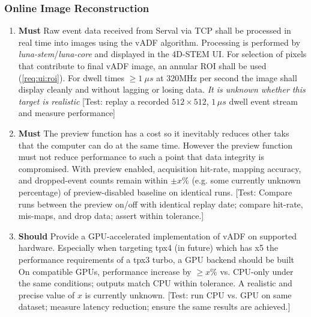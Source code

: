 \documentclass[12pt]{article}
\newcommand{\PriorityTag}[2]{%
  \colorbox{#2!25}{\footnotesize\textsf{\textbf{#1}}}\hspace{0.6em}}
\newcommand{\must}{\leavevmode\PriorityTag{Must}{green}}
\newcommand{\should}{\leavevmode\PriorityTag{Should}{yellow}}
\newcounter{reqgrp}[section] %
\newcounter{reqno}
\newcommand{\reqprefix}{GEN}
\newenvironment{requirements}[1]{%
  \renewcommand{\reqprefix}{#1}%
  \refstepcounter{reqgrp}%
  \setcounter{reqno}{0}%
  \begin{enumerate}[leftmargin=*]
}{\end{enumerate}}
\begin{document}
\subsubsection{Online Image Reconstruction}
\begin{requirements}{OIR}

\item \must {}
  {Raw event data received from Serval via TCP shall be processed in real time into images using the vADF algorithm. Processing is performed by \emph{luna-stem}/\emph{luna-core} and displayed in the 4D-STEM UI. For selection of pixels that contribute to final vADF image, an annular ROI shall be used (\cref{req:ui:roi})}.
  {For dwell times \(\ge 1\ \mu s\) at 320MHz per second the image shall display cleanly and without lagging or losing data. \textit{It is unknown whether this target is realistic}}
  [Test: replay a recorded \(512\times512\), \(1\,\mu s\) dwell event stream and measure performance]

\item \must {}
  {The preview function has a cost so it inevitably reduces other taks that the computer can do at the same time. However the preview function must not reduce performance to such a point that data integrity is compromised.}
  {With preview enabled, acquisition hit-rate, mapping accuracy, and dropped-event counts remain within \(\pm x\%\) (e.g. some currently unknown percentage) of preview-disabled baseline on identical runs.}
  [Test: Compare runs between the preview on/off with identical replay date; compare hit-rate, mis-maps, and drop data; assert within tolerance.]

\item \should {}
  {Provide a GPU-accelerated implementation of vADF on supported hardware. Especially when targeting tpx4 (in future) which has x5 the performance requirements of a tpx3 turbo, a GPU backend should be built}
  {On compatible GPUs, performance increase by \(\ge x\%\) vs. CPU-only under the same conditions; outputs match CPU within tolerance. A realistic and precise value of \(x\) is currently unknown. }
  [Test: run CPU vs. GPU on same dataset; measure latency reduction; ensure the same results are achieved.]

\end{requirements}
\end{document}
